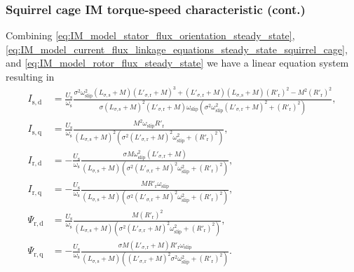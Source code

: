 \begin{frame}
	\frametitle{Squirrel cage IM torque-speed characteristic (cont.)} 
    Combining \eqref{eq:IM_model_stator_flux_orientation_steady_state}, \eqref{eq:IM_model_current_flux_linkage_equations_steady_state_squirrel_cage}, and \eqref{eq:IM_model_rotor_flux_steady_state} we have a linear equation system resulting in 
    \small
    \begin{align}
        I_\mathrm{s,d} &= \frac{U_\mathrm{s}}{\omega_\mathrm{s}}\frac{\sigma^2 \omega^2_\mathrm{slip} (L_{\sigma,\mathrm{s}} +M)(L'_{\sigma,\mathrm{r}} +M)^3 + (L'_{\sigma,\mathrm{r}} +M)(L_{\sigma,\mathrm{s}} +M)(R'_\mathrm{r})^2 - M^2(R'_\mathrm{r})^2}{\sigma (L_{\sigma,\mathrm{s}} +M)^2(L'_{\sigma,\mathrm{r}} +M) \omega_\mathrm{slip}(\sigma^2 \omega^2_\mathrm{slip}(L'_{\sigma,\mathrm{r}} +M)^2 + (R'_\mathrm{r})^2)},\\
        I_\mathrm{s,q} &= \frac{U_\mathrm{s}}{\omega_\mathrm{s}} \frac{M^2 \omega_\mathrm{slip}R'_\mathrm{r}}{(L_{\sigma,\mathrm{s}} +M)^2(\sigma^2 (L'_{\sigma,\mathrm{r}} +M)^2\omega_\mathrm{slip}^2 + (R'_\mathrm{r})^2)},\\
        I_\mathrm{r,d} &= -\frac{U_\mathrm{s}}{\omega_\mathrm{s}} \frac{\sigma M  \omega_\mathrm{slip}^2(L'_{\sigma,\mathrm{r}} +M)}{(L_{\sigma,\mathrm{s}} +M)(\sigma^2 (L'_{\sigma,\mathrm{r}} +M)^2\omega_\mathrm{slip}^2 + (R'_\mathrm{r})^2)},\\
        I_\mathrm{r,q} &= -\frac{U_\mathrm{s}}{\omega_\mathrm{s}} \frac{M R'_\mathrm{r} \omega_\mathrm{slip}}{(L_{\sigma,\mathrm{s}} +M)(\sigma^2 (L'_{\sigma,\mathrm{r}} +M)^2\omega_\mathrm{slip}^2 + (R'_\mathrm{r})^2)},\\
        \Psi_\mathrm{r,d} &= \frac{U_\mathrm{s}}{\omega_\mathrm{s}}\frac{M (R'_\mathrm{r})^2}{(L_{\sigma,\mathrm{s}} +M) (\sigma^2(L'_{\sigma,\mathrm{r}} +M)^2\omega_\mathrm{slip}^2 + (R'_\mathrm{r})^2)},\\
        \Psi_\mathrm{r,q} &= -\frac{U_\mathrm{s}}{\omega_\mathrm{s}}\frac{\sigma M(L'_{\sigma,\mathrm{r}} +M)R'_\mathrm{r}\omega_\mathrm{slip}}{(L_{\sigma,\mathrm{s}} +M)((L'_{\sigma,\mathrm{r}} +M)^2\sigma^2\omega_\mathrm{slip}^2+(R'_\mathrm{r})^2)}.
    \end{align}
    \normalsize 
\end{frame}

